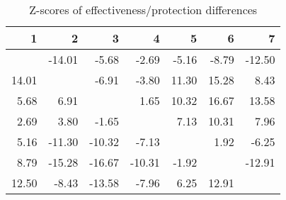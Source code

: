 \begin{table}[ht]
\centering
\begin{tabular}{rrrrrrr}
  \hline
1 & 2 & 3 & 4 & 5 & 6 & 7 \\ 
  \hline
 & -14.01 & -5.68 & -2.69 & -5.16 & -8.79 & -12.50 \\ 
  14.01 &  & -6.91 & -3.80 & 11.30 & 15.28 & 8.43 \\ 
  5.68 & 6.91 &  & 1.65 & 10.32 & 16.67 & 13.58 \\ 
  2.69 & 3.80 & -1.65 &  & 7.13 & 10.31 & 7.96 \\ 
  5.16 & -11.30 & -10.32 & -7.13 &  & 1.92 & -6.25 \\ 
  8.79 & -15.28 & -16.67 & -10.31 & -1.92 &  & -12.91 \\ 
  12.50 & -8.43 & -13.58 & -7.96 & 6.25 & 12.91 &  \\ 
   \hline
\end{tabular}
\caption{Z-scores of effectiveness/protection differences} 
\end{table}
